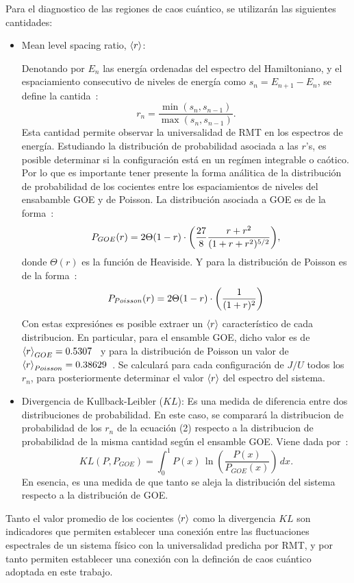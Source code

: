 \documentclass[spanish,titlepage,table]{practicas}
\begin{document}
Para el diagnostico de las regiones de caos cuántico, se utilizarán las siguientes cantidades:
\begin{itemize}
    \item Mean level spacing ratio, $\ev{r}$:

Denotando por $E_n$ las energía ordenadas del espectro del Hamiltoniano, y el espaciamiento consecutivo de niveles de energía como 
$s_n=E_{n+1}-E_{n}$, se define la cantida~\cite{Atas_2013}:
\begin{equation}
	r_n=\frac{\min(s_n,s_{n-1})}{\max(s_n,s_{n-1})}.
\end{equation}
Esta cantidad permite observar la universalidad de RMT en los espectros de energía.
Estudiando la distribución de probabilidad asociada a las $r$'s, es posible determinar si la configuración está en un regímen integrable 
o caótico. Por lo que es importante tener presente la forma análitica de la distribución de probabilidad de los cocientes entre 
los espaciamientos de niveles del ensabamble GOE y de Poisson.
La distribución asociada a GOE es de la forma~\cite{Atas_2013}:
\begin{equation}
 P_{GOE}(r)=2\Theta(1-r)\cdot \qty(\frac{27}{8}\frac{r+r^{2}}{(1+r+r^{2})^{5/2}}),
\end{equation}
donde $\Theta(r)$ es la función de Heaviside.
Y para la distribución de Poisson es de la forma~\cite{Tekur2020}:
\begin{equation}
    P_{Poisson}(r)=2\Theta(1-r)\cdot\qty(\frac{1}{(1+r)^{2}})
\end{equation}
Con estas expresiónes es posible extraer un $\ev{r}$ característico de cada distribucion.
En particular, para el ensamble GOE, dicho valor es de $\ev{r}_{GOE}=0.5307$~\cite{Atas_2013} 
y para la distribución de Poisson  un valor de $\ev{r}_{Poisson}=0.38629$~\cite{Atas_2013}. 
Se calculará para cada configuración de $J/U$ todos los $r_n$, para posteriormente determinar el valor $\ev{r}$ del espectro del sistema.
    \item Divergencia de Kullback-Leibler ($KL$): Es una medida de diferencia entre dos distribuciones de probabilidad. En este caso, se comparará la distribucion de probabilidad de los $r_n$ de la ecuación (2)
    respecto a la distribucion de probabilidad de la misma cantidad según el ensamble GOE. Viene dada por~\cite{Pausch2022}:
    \begin{equation}
KL(P,P_{GOE}) = \int_{0}^{1} P(x) \, \ln \left( \frac{P(x)}{P_{GOE}(x)} \right) \, dx.
    \end{equation}
    En esencia, es una medida de que tanto se aleja la distribución del sistema respecto a la distribución de GOE.   
\end{itemize}
Tanto el valor promedio de los cocientes $\ev{r}$ como la divergencia $KL$ son indicadores que permiten establecer una conexión entre las fluctuaciones espectrales de un sistema físico 
con la universalidad predicha por RMT, y por tanto permiten establecer una conexión con la definción de caos cuántico adoptada en este trabajo.
\end{document}
